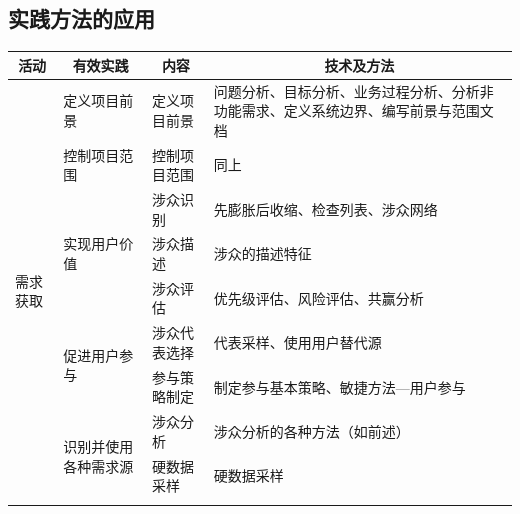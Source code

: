 \subsection{实践方法的应用}

\vspace{-0.8em}
\begin{center}
    \begin{longtable}{|m{2cm}|m{3.5cm}|m{3.2cm}|m{4.6cm}|}
        \hline
        \multicolumn{1}{|c|}{活动} & \multicolumn{1}{c|}{有效实践}   & \multicolumn{1}{c|}{内容}          & \multicolumn{1}{c|}{技术及方法}                \\ \hline
        \multirow{15}{*}{需求获取}   & 定义项目前景                      & 定义项目前景                           & 问题分析、目标分析、业务过程分析、分析非功能需求、定义系统边界、编写前景与范围文档 \\ \cline{2-4} 
                                 & 控制项目范围                      & 控制项目范围                           & 同上                                        \\ \cline{2-4} 
                                 & \multirow{3}{*}{实现用户价值}     & 涉众识别                             & 先膨胀后收缩、检查列表、涉众网络                          \\ \cline{3-4} 
                                 &                             & 涉众描述                             & 涉众的描述特征                                   \\ \cline{3-4} 
                                 &                             & 涉众评估                             & 优先级评估、风险评估、共赢分析                           \\ \cline{2-4} 
                                 & \multirow{2}{*}{促进用户参与}     & 涉众代表选择                           & 代表采样、使用用户替代源                              \\ \cline{3-4} 
                                 &                             & 参与策略制定                           & 制定参与基本策略、敏捷方法---用户参与                      \\ \cline{2-4} 
                                 & \multirow{3}{*}{识别并使用各种需求源} & 涉众分析                             & 涉众分析的各种方法（如前述）                            \\ \cline{3-4} 
                                 &                             & 硬数据采样                            & 硬数据采样                                     \\ \cline{3-4} 

\end{longtable}
\end{center}
